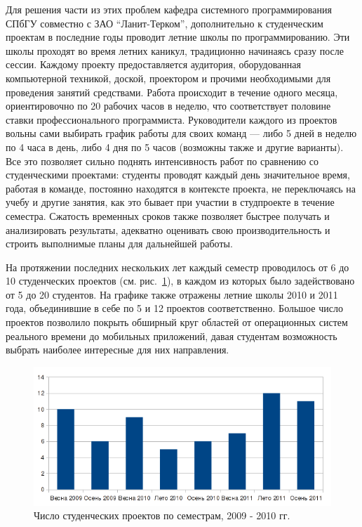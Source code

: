 \documentclass[a4paper]{article}
\begin{document}
Для решения части из этих проблем кафедра системного программирования СПбГУ совместно с ЗАО ``Ланит-Терком'', дополнительно к студенческим проектам в последние годы проводит летние школы по программированию. Эти школы проходят во время летних каникул, традиционно начинаясь сразу после сессии. Каждому проекту предоставляется аудитория, оборудованная компьютерной техникой, доской, проектором и прочими необходимыми для проведения занятий средствами. Работа происходит в течение одного месяца, ориентировочно по 20 рабочих часов в неделю, что соответствует половине ставки профессионального программиста. Руководители каждого из проектов вольны сами выбирать график работы для своих команд ---  либо 5 дней в неделю по 4 часа в день, либо 4 дня по 5 часов (возможны также и другие варианты). Все это позволяет сильно поднять интенсивность работ по сравнению со студенческими проектами: студенты проводят каждый день значительное время, работая в команде, постоянно находятся в контексте проекта, не переключаясь на учебу и другие занятия, как это бывает при участии в студпроекте в течение семестра. Сжатость временных сроков также позволяет быстрее получать и анализировать результаты, адекватно оценивать свою производительность и строить выполнимые планы для дальнейшей работы. 

На протяжении последних нескольких лет каждый семестр проводилось от 6 до 10 студенческих проектов (см. рис.~\ref{projects}), в каждом из которых было задействовано от 5 до 20 студентов. На графике также отражены летние школы 2010 и 2011 года, объединившие в себе по 5 и 12 проектов соответственно. Большое число проектов позволило покрыть обширный круг областей от операционных систем реального времени до мобильных приложений, давая студентам возможность выбрать наиболее интересные для них направления.

\begin{figure} [ht]
  \begin{center}
    \includegraphics[width=1\textwidth]{01-projects.png}
    \caption{Число студенческих проектов по семестрам, 2009 - 2010 гг.}
    \label{projects}
  \end{center}
\end{figure}
\end{document}
